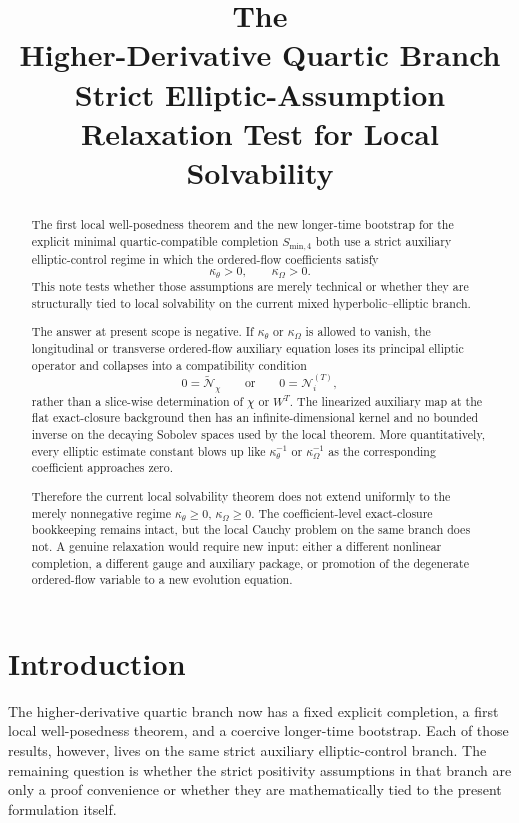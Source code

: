 \documentclass[11pt]{article}
\title{\textbf{The \TheoryName{}}\\[0.4em]
\large Higher-Derivative Quartic Branch Strict Elliptic-Assumption Relaxation Test for Local Solvability}
\author{}
\date{}
\begin{document}
\maketitle

\begin{abstract}
The first local well-posedness theorem and the new longer-time bootstrap for the explicit minimal quartic-compatible completion \(S_{\mathrm{min},4}\) both use a strict auxiliary elliptic-control regime in which the ordered-flow coefficients satisfy
\[
\kappa_\theta>0,
\qquad
\kappa_\Omega>0.
\]
This note tests whether those assumptions are merely technical or whether they are structurally tied to local solvability on the current mixed hyperbolic--elliptic branch.

The answer at present scope is negative. If \(\kappa_\theta\) or \(\kappa_\Omega\) is allowed to vanish, the longitudinal or transverse ordered-flow auxiliary equation loses its principal elliptic operator and collapses into a compatibility condition
\[
0=\widetilde{\mathcal N}_\chi
\qquad \text{or} \qquad
0=\mathcal N_i^{(T)},
\]
rather than a slice-wise determination of \(\chi\) or \(W^T\). The linearized auxiliary map at the flat exact-closure background then has an infinite-dimensional kernel and no bounded inverse on the decaying Sobolev spaces used by the local theorem. More quantitatively, every elliptic estimate constant blows up like \(\kappa_\theta^{-1}\) or \(\kappa_\Omega^{-1}\) as the corresponding coefficient approaches zero.

Therefore the current local solvability theorem does not extend uniformly to the merely nonnegative regime \(\kappa_\theta\ge 0\), \(\kappa_\Omega\ge 0\). The coefficient-level exact-closure bookkeeping remains intact, but the local Cauchy problem on the same branch does not. A genuine relaxation would require new input: either a different nonlinear completion, a different gauge and auxiliary package, or promotion of the degenerate ordered-flow variable to a new evolution equation.
\end{abstract}

\section{Introduction}

The higher-derivative quartic branch now has a fixed explicit completion, a first local well-posedness theorem, and a coercive longer-time bootstrap. Each of those results, however, lives on the same strict auxiliary elliptic-control branch. The remaining question is whether the strict positivity assumptions in that branch are only a proof convenience or whether they are mathematically tied to the present formulation itself.
\end{document}
